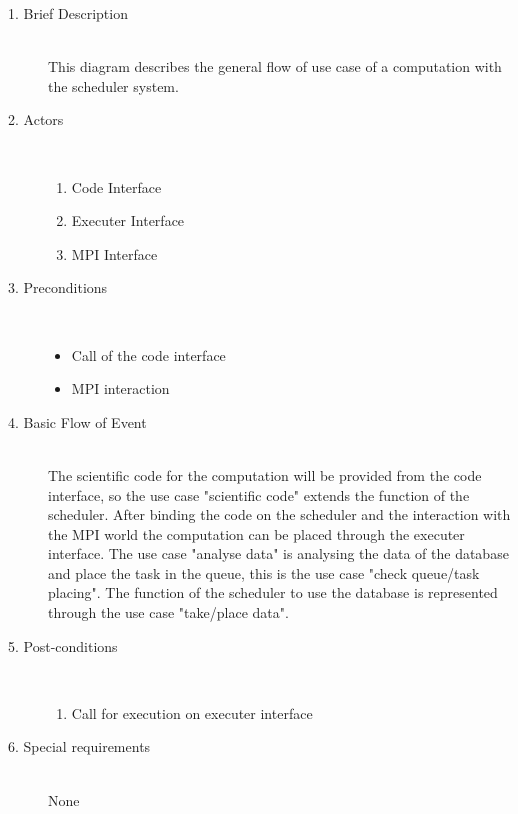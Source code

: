 	\begin{description}
\item [1. Brief Description]\hfill \\
This diagram describes the general flow of use case of a computation with the scheduler system.

\item [2. Actors]\hfill \\
\vspace{-6.5mm}
	\begin{enumerate}
		\item Code Interface
		\item Executer Interface
		\item MPI Interface
	\end{enumerate}

\newpage
\item [3. Preconditions]\hfill \\
\vspace{-6.5mm}
\begin{itemize}
\item Call of the code interface
\item MPI interaction

\end{itemize}

\item [4. Basic Flow of Event]\hfill \\
The scientific code for the computation will be provided from the code interface, so the use case "scientific code" extends the function of the scheduler. After binding the code on the scheduler and the interaction with the MPI world the computation can be placed through the executer interface. The use case "analyse data" is analysing the data of the database and place the task in the queue, this is the use case "check queue/task placing". The function of the scheduler to use the database is represented through the use case "take/place data".


\item [5. Post-conditions]\hfill \\
\vspace{-6.5mm}
\begin{enumerate}
\item Call for execution on executer interface
\end{enumerate}

\item [6. Special requirements]\hfill \\
\vspace{-6.5mm}
None

\end{description}

